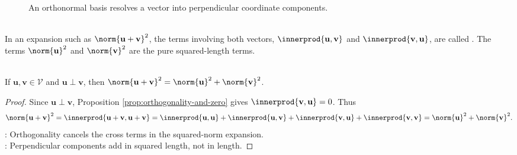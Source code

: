 \begin{figure}[H]
  \centering
  
  \caption{An orthonormal basis resolves a vector into perpendicular coordinate components.}
  \label{fig:orthonormal-coordinates}
\end{figure}

\begin{remark} \label{rem:cross-terms} \\
In an expansion such as $\norm{\mathbf{u}+\mathbf{v}}^2$, the terms involving both vectors, $\innerprod{\mathbf{u},\mathbf{v}}$ and $\innerprod{\mathbf{v},\mathbf{u}}$, are called . The terms $\norm{\mathbf{u}}^2$ and $\norm{\mathbf{v}}^2$ are the pure squared-length terms.
\end{remark}

\begin{theorem} \label{thm:pythagorean-inner-product} \\
If $\mathbf{u},\mathbf{v}\in\mathcal{V}$ and $\mathbf{u}\perp\mathbf{v}$, then $\norm{\mathbf{u}+\mathbf{v}}^2=\norm{\mathbf{u}}^2+\norm{\mathbf{v}}^2$.
\begin{proof}
Since $\mathbf{u}\perp\mathbf{v}$, Proposition \ref{prop:orthogonality-and-zero} gives $\innerprod{\mathbf{v},\mathbf{u}}=0$. Thus
\begin{align}
\norm{\mathbf{u}+\mathbf{v}}^2 =\innerprod{\mathbf{u}+\mathbf{v},\mathbf{u}+\mathbf{v}}=\innerprod{\mathbf{u},\mathbf{u}}+\innerprod{\mathbf{u},\mathbf{v}}
  +\innerprod{\mathbf{v},\mathbf{u}}+\innerprod{\mathbf{v},\mathbf{v}} =\norm{\mathbf{u}}^2+\norm{\mathbf{v}}^2.
\nonumber
\end{align}
: Orthogonality cancels the cross terms in the squared-norm expansion.\\
: Perpendicular components add in squared length, not in length.
\end{proof}
\end{theorem}

